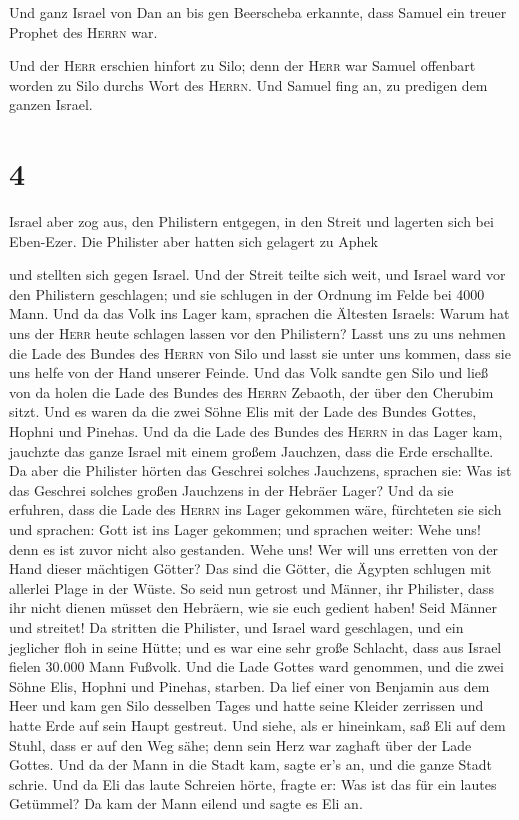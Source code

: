  Und ganz Israel von Dan an bis gen Beerscheba erkannte,
dass Samuel ein treuer Prophet des \textsc{Herrn} war.

 Und der \textsc{Herr} erschien hinfort zu Silo; denn der
\textsc{Herr} war Samuel offenbart worden zu Silo durchs Wort des
\textsc{Herrn}. Und Samuel fing an, zu predigen dem ganzen Israel.

\hypertarget{section-3}{%
\section{4}\label{section-3}}

 Israel aber zog aus, den Philistern entgegen, in den
Streit und lagerten sich bei Eben-Ezer. Die Philister aber hatten sich
gelagert zu Aphek

 und stellten sich gegen Israel. Und der Streit teilte
sich weit, und Israel ward vor den Philistern geschlagen; und sie
schlugen in der Ordnung im Felde bei 4000 Mann.  Und da
das Volk ins Lager kam, sprachen die Ältesten Israels: Warum hat uns der
\textsc{Herr} heute schlagen lassen vor den Philistern? Lasst uns zu uns
nehmen die Lade des Bundes des \textsc{Herrn} von Silo und lasst sie
unter uns kommen, dass sie uns helfe von der Hand unserer Feinde.
 Und das Volk sandte gen Silo und ließ von da holen die
Lade des Bundes des \textsc{Herrn} Zebaoth, der über den Cherubim sitzt.
Und es waren da die zwei Söhne Elis mit der Lade des Bundes Gottes,
Hophni und Pinehas.  Und da die Lade des Bundes des
\textsc{Herrn} in das Lager kam, jauchzte das ganze Israel mit einem
großem Jauchzen, dass die Erde erschallte.  Da aber die
Philister hörten das Geschrei solches Jauchzens, sprachen sie: Was ist
das Geschrei solches großen Jauchzens in der Hebräer Lager? Und da sie
erfuhren, dass die Lade des \textsc{Herrn} ins Lager gekommen wäre,
 fürchteten sie sich und sprachen: Gott ist ins Lager
gekommen; und sprachen weiter: Wehe uns! denn es ist zuvor nicht also
gestanden.  Wehe uns! Wer will uns erretten von der Hand
dieser mächtigen Götter? Das sind die Götter, die Ägypten schlugen mit
allerlei Plage in der Wüste.  So seid nun getrost und
Männer, ihr Philister, dass ihr nicht dienen müsset den Hebräern, wie
sie euch gedient haben! Seid Männer und streitet!  Da
stritten die Philister, und Israel ward geschlagen, und ein jeglicher
floh in seine Hütte; und es war eine sehr große Schlacht, dass aus
Israel fielen 30.000 Mann Fußvolk.  Und die Lade Gottes
ward genommen, und die zwei Söhne Elis, Hophni und Pinehas, starben.
 Da lief einer von Benjamin aus dem Heer und kam gen Silo
desselben Tages und hatte seine Kleider zerrissen und hatte Erde auf
sein Haupt gestreut.  Und siehe, als er hineinkam, saß
Eli auf dem Stuhl, dass er auf den Weg sähe; denn sein Herz war zaghaft
über der Lade Gottes. Und da der Mann in die Stadt kam, sagte er's an,
und die ganze Stadt schrie.  Und da Eli das laute
Schreien hörte, fragte er: Was ist das für ein lautes Getümmel? Da kam
der Mann eilend und sagte es Eli an.

